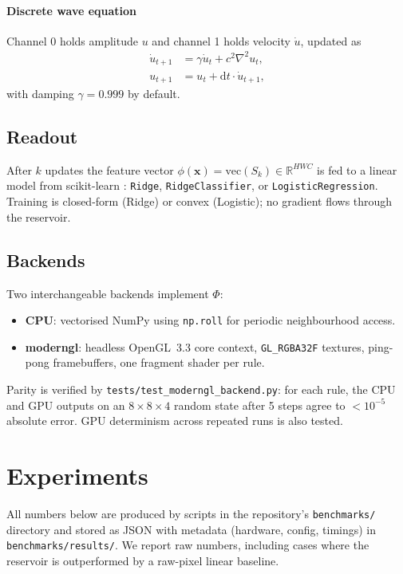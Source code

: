 \documentclass[11pt,a4paper]{article}
\begin{document}
\paragraph{Discrete wave equation} Channel 0 holds amplitude $u$ and channel
1 holds velocity $\dot u$, updated as
\begin{align}
    \dot u_{t+1} &= \gamma \dot u_t + c^2 \nabla^2 u_t, \\
    u_{t+1} &= u_t + \mathrm{d}t \cdot \dot u_{t+1},
\end{align}
with damping $\gamma = 0.999$ by default.

\subsection{Readout}

After $k$ updates the feature vector $\phi(\mathbf{x}) = \mathrm{vec}(S_k) \in
\mathbb{R}^{HWC}$ is fed to a linear model from scikit-learn
\citep{pedregosa2011}: \texttt{Ridge}, \texttt{RidgeClassifier}, or
\texttt{LogisticRegression}. Training is closed-form (Ridge) or convex
(Logistic); no gradient flows through the reservoir.

\subsection{Backends}

Two interchangeable backends implement $\Phi$:

\begin{itemize}
    \item \textbf{CPU}: vectorised NumPy \citep{harris2020} using
    \texttt{np.roll} for periodic neighbourhood access.
    \item \textbf{moderngl}: headless OpenGL~3.3 core context,
    \texttt{GL\_RGBA32F} textures, ping-pong framebuffers, one fragment shader
    per rule.
\end{itemize}

Parity is verified by \texttt{tests/test\_moderngl\_backend.py}: for each rule,
the CPU and GPU outputs on an $8{\times}8{\times}4$ random state after 5 steps
agree to $< 10^{-5}$ absolute error. GPU determinism across repeated runs is
also tested.

\section{Experiments}

All numbers below are produced by scripts in the repository's
\texttt{benchmarks/} directory and stored as JSON with metadata (hardware,
config, timings) in \texttt{benchmarks/results/}. We report raw numbers,
including cases where the reservoir is outperformed by a raw-pixel linear
baseline.
\end{document}
